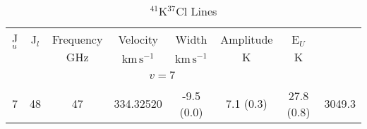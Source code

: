 \begin{table*}[htp]
\centering
\caption{$^{41}$K$^{37}$Cl Lines}
\begin{tabular}{ccccccc}
\label{tab:41K37Cl_salt_lines}
 J$_u$ & J$_l$ & Frequency & Velocity & Width & Amplitude & E$_U$ \\
  &  & $\mathrm{GHz}$ & $\mathrm{km\,s^{-1}}$ & $\mathrm{km\,s^{-1}}$ & $\mathrm{K}$ & $\mathrm{K}$ \\
\hline
\hline
&\vspace{-0.75em}\\
 \\
\vspace{-0.75em}\\
7 & 48 & 47 & 334.32520 & -9.5 (0.0) & 7.1 (0.3) & 27.8 (0.8) & 3049.3 \\
\end{tabular}

\par 
\end{table*}
